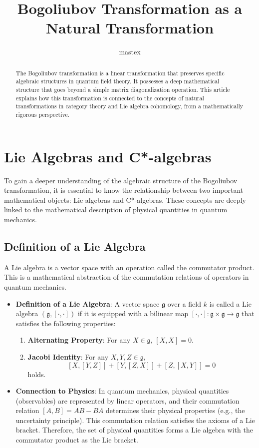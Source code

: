 \documentclass[uplatex,a4j,12pt,dvipdfmx]{article}
\title{
Bogoliubov Transformation \newline as a Natural Transformation
}
\author{
mastex
}
\begin{document}
\maketitle

\begin{abstract}
    The Bogoliubov transformation is a linear transformation that preserves specific algebraic structures in quantum field theory. It possesses a deep mathematical structure that goes beyond a simple matrix diagonalization operation. This article explains how this transformation is connected to the concepts of natural transformations in category theory and Lie algebra cohomology, from a mathematically rigorous perspective.
\end{abstract}


\section{Lie Algebras and C*-algebras}

To gain a deeper understanding of the algebraic structure of the Bogoliubov transformation, it is essential to know the relationship between two important mathematical objects: Lie algebras and C*-algebras. These concepts are deeply linked to the mathematical description of physical quantities in quantum mechanics.

\subsection{Definition of a Lie Algebra}

A Lie algebra is a vector space with an operation called the commutator product. This is a mathematical abstraction of the commutation relations of operators in quantum mechanics.

\begin{itemize}
    \item \textbf{Definition of a Lie Algebra}:
    A vector space $\mathfrak{g}$ over a field $k$ is called a Lie algebra $(\mathfrak{g}, [\cdot, \cdot])$ if it is equipped with a bilinear map $[\cdot, \cdot]: \mathfrak{g} \times \mathfrak{g} \to \mathfrak{g}$ that satisfies the following properties:
    \begin{enumerate}
        \item \textbf{Alternating Property}: For any $X \in \mathfrak{g}$, $[X, X] = 0$.
        \item \textbf{Jacobi Identity}: For any $X, Y, Z \in \mathfrak{g}$,
        \[
            [X, [Y, Z]] + [Y, [Z, X]] + [Z, [X, Y]] = 0
        \]
        holds.
    \end{enumerate}
    \item \textbf{Connection to Physics}:
    In quantum mechanics, physical quantities (observables) are represented by linear operators, and their commutation relation $[A, B] = AB - BA$ determines their physical properties (e.g., the uncertainty principle). This commutation relation satisfies the axioms of a Lie bracket. Therefore, the set of physical quantities forms a Lie algebra with the commutator product as the Lie bracket.
\end{itemize}
\end{document}
